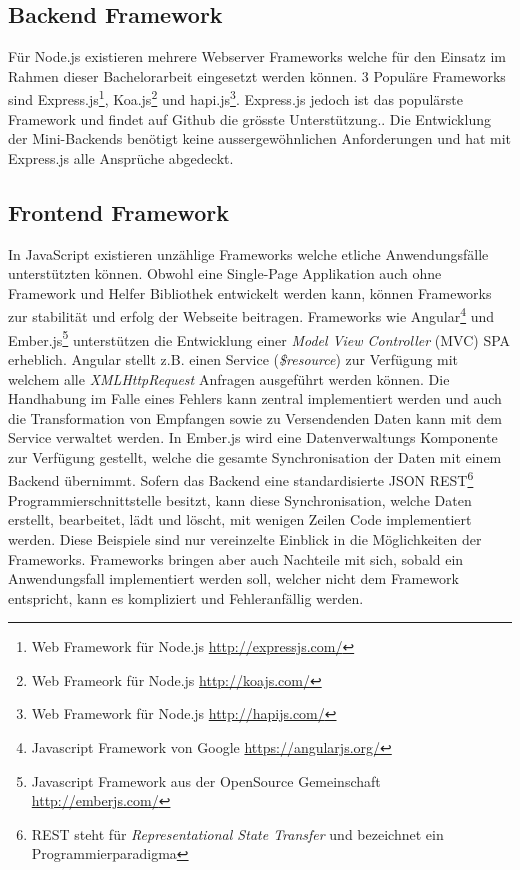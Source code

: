 \subsection{Backend Framework}
Für Node.js existieren mehrere Webserver Frameworks welche für den Einsatz im Rahmen dieser Bachelorarbeit eingesetzt werden können. 3 Populäre Frameworks sind Express.js\footnote{Web Framework für Node.js \url{http://expressjs.com/}}, Koa.js\footnote{Web Frameork für Node.js \url{http://koajs.com/}} und hapi.js\footnote{Web Framework für Node.js \url{http://hapijs.com/}}. Express.js jedoch ist das populärste Framework und findet auf Github die grösste Unterstützung.\citep[]{nodejsframeworks}. Die Entwicklung der Mini-Backends benötigt keine aussergewöhnlichen Anforderungen und hat mit Express.js alle Ansprüche abgedeckt.

\subsection{Frontend Framework}
In JavaScript existieren unzählige Frameworks welche etliche Anwendungsfälle unterstützten können. Obwohl eine Single-Page Applikation auch ohne Framework und Helfer Bibliothek entwickelt werden kann, können Frameworks zur stabilität und erfolg der Webseite beitragen. Frameworks wie Angular\footnote{Javascript Framework von Google \url{https://angularjs.org/}} und Ember.js\footnote{Javascript Framework aus der OpenSource Gemeinschaft \url{http://emberjs.com/}} unterstützen die Entwicklung einer \textit{Model View Controller} (MVC) SPA erheblich. Angular stellt z.B. einen Service (\textit{\$resource}) zur Verfügung mit welchem alle \textit{XMLHttpRequest} Anfragen ausgeführt werden können. Die Handhabung im Falle eines Fehlers kann zentral implementiert werden und auch die Transformation von Empfangen sowie zu Versendenden Daten kann mit dem Service verwaltet werden. In Ember.js wird eine Datenverwaltungs Komponente zur Verfügung gestellt, welche die gesamte Synchronisation der Daten mit einem Backend übernimmt. Sofern das Backend eine standardisierte JSON REST\footnote{REST steht für \textit{Representational State Transfer} und bezeichnet ein Programmierparadigma} Programmierschnittstelle besitzt, kann diese Synchronisation, welche Daten erstellt, bearbeitet, lädt und löscht, mit wenigen Zeilen Code implementiert werden. Diese Beispiele sind nur vereinzelte Einblick in die Möglichkeiten der Frameworks. Frameworks bringen aber auch Nachteile mit sich, sobald ein Anwendungsfall implementiert werden soll, welcher nicht dem Framework entspricht, kann es kompliziert und Fehleranfällig werden.
